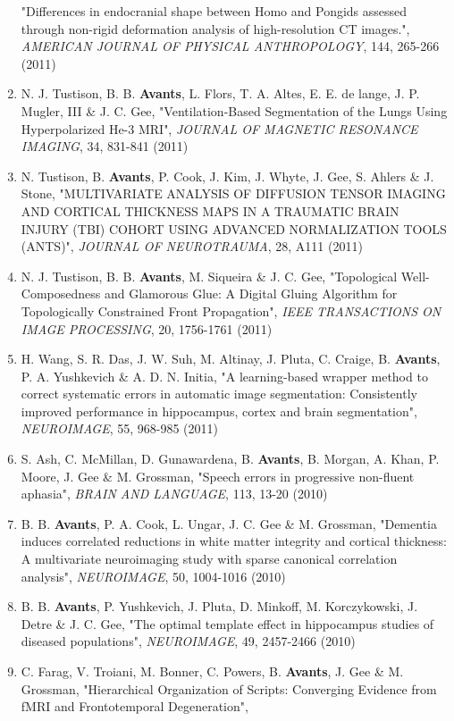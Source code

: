 \documentclass[11pt]{moderncv} %
\begin{document}
\begin{enumerate}
"Differences in endocranial shape between Homo and Pongids assessed through non-rigid deformation analysis of high-resolution CT images.", 
{\em AMERICAN JOURNAL OF PHYSICAL ANTHROPOLOGY}, 144, 265-266 (2011)
\item N. J. Tustison, B. B. \textbf{Avants}, L. Flors, T. A. Altes, E. E. de lange, J. P. Mugler, III \&  J. C. Gee, 
"Ventilation-Based Segmentation of the Lungs Using Hyperpolarized He-3 MRI", 
{\em JOURNAL OF MAGNETIC RESONANCE IMAGING}, 34, 831-841 (2011)
\item N. Tustison, B. \textbf{Avants}, P. Cook, J. Kim, J. Whyte, J. Gee, S. Ahlers \&  J. Stone, 
"MULTIVARIATE ANALYSIS OF DIFFUSION TENSOR IMAGING AND CORTICAL THICKNESS MAPS IN A TRAUMATIC BRAIN INJURY (TBI) COHORT USING ADVANCED NORMALIZATION TOOLS (ANTS)", 
{\em JOURNAL OF NEUROTRAUMA}, 28, A111 (2011)
\item N. J. Tustison, B. B. \textbf{Avants}, M. Siqueira \&  J. C. Gee, 
"Topological Well-Composedness and Glamorous Glue: A Digital Gluing Algorithm for Topologically Constrained Front Propagation", 
{\em IEEE TRANSACTIONS ON IMAGE PROCESSING}, 20, 1756-1761 (2011)
\item H. Wang, S. R. Das, J. W. Suh, M. Altinay, J. Pluta, C. Craige, B. \textbf{Avants}, P. A. Yushkevich \&  A. D. N. Initia, 
"A learning-based wrapper method to correct systematic errors in automatic image segmentation: Consistently improved performance in hippocampus, cortex and brain segmentation", 
{\em NEUROIMAGE}, 55, 968-985 (2011)
\item S. Ash, C. McMillan, D. Gunawardena, B. \textbf{Avants}, B. Morgan, A. Khan, P. Moore, J. Gee \&  M. Grossman, 
"Speech errors in progressive non-fluent aphasia", 
{\em BRAIN AND LANGUAGE}, 113, 13-20 (2010)
\item B. B. \textbf{Avants}, P. A. Cook, L. Ungar, J. C. Gee \&  M. Grossman, 
"Dementia induces correlated reductions in white matter integrity and cortical thickness: A multivariate neuroimaging study with sparse canonical correlation analysis", 
{\em NEUROIMAGE}, 50, 1004-1016 (2010)
\item B. B. \textbf{Avants}, P. Yushkevich, J. Pluta, D. Minkoff, M. Korczykowski, J. Detre \&  J. C. Gee, 
"The optimal template effect in hippocampus studies of diseased populations", 
{\em NEUROIMAGE}, 49, 2457-2466 (2010)
\item C. Farag, V. Troiani, M. Bonner, C. Powers, B. \textbf{Avants}, J. Gee \&  M. Grossman, 
"Hierarchical Organization of Scripts: Converging Evidence from fMRI and Frontotemporal Degeneration", 

\end{enumerate}
\end{document}
